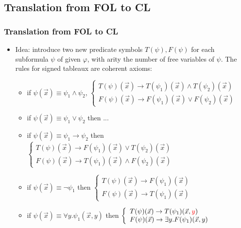 \documentclass[handout,11pt]{beamer}
\newcommand{\red}[1]{\textcolor{red}{#1}}
\begin{document}
\subsection{Translation from FOL to CL}

\begin{frame}
\frametitle{Translation from FOL to CL}
 \begin{itemize}[<+->]
   \item Idea: introduce two new predicate symbols 
   $T(\psi),F(\psi)$ for each subformula $\psi$ of given $\varphi$, 
   with arity the number of free variables of $\psi$.
   The rules for signed tableaux are coherent axioms:
   \begin{itemize} 
   \item 
 if $\psi(\vec{x})\equiv\psi_1\wedge\psi_2$,
$\left\{\begin{array}{ll}
T(\psi)(\vec{x})\to T(\psi_1)(\vec{x})\wedge T(\psi_2)(\vec{x})\\
F(\psi)(\vec{x})\to F(\psi_1)(\vec{x})\vee F(\psi_2)(\vec{x})
\end{array}\right.$

\item

 if $\psi(\vec{x})\equiv\psi_1\vee \psi_2$ then ...

\item
  if $\psi(\vec{x})\equiv\psi_1\to \psi_2$ then 
$\left\{\begin{array}{ll}
T(\psi)(\vec{x})\to F(\psi_1)(\vec{x})\vee T(\psi_2)(\vec{x})\\
F(\psi)(\vec{x})\to T(\psi_1)(\vec{x})\wedge F(\psi_2)(\vec{x})
\end{array}\right.$

\item

 if $\psi(\vec{x})\equiv\neg \psi_1$ then 
$\left\{\begin{array}{ll}
T(\psi)(\vec{x})\to F(\psi _1)(\vec{x})\\
F(\psi)(\vec{x})\to T(\psi _1)(\vec{x})
\end{array}\right.$

\item

 if $\psi(\vec{x})\equiv\forall y.\psi_1(\vec{x},y)$ then 
$\left\{\begin{array}{ll}
T(\psi)(\vec{x})\to T(\psi_1)(\vec{x},\red{y})\\
F(\psi)(\vec{x})\to \exists y.F(\psi_1)(\vec{x},y)
\end{array}\right.$


\end{itemize}
\end{itemize}
\end{frame}
\end{document}
